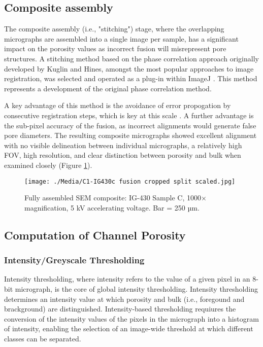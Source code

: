 \documentclass[3p,twocolumn]{elsarticle}
\begin{document}
\subsection{Composite assembly}

The composite assembly (i.e., "stitching") stage, where the overlapping
micrographs are assembled into a single image per sample, has a significant
impact on the porosity values as incorrect fusion will misrepresent pore
structures. A stitching method based on the phase correlation approach
originally developed by Kuglin and Hines, amongst the most popular approaches to
image registration, was selected and operated as a plug-in within ImageJ
\citep{Kuglin1975, Preibisch2009}. This method represents a development of the
original phase correlation method\citep{Preibisch2009}.
	
	 A key advantage of this method is the avoidance of error propogation by
	consecutive registration steps, which is key at this scale
	\citep{Preibisch2009}. A further advantage is the sub-pixel accuracy of the
	fusion, as incorrect alignments would generate false pore diameters. The
	resulting composite micrographs showed excellent alignment with no visible
	delineation between individual micrographs, a relatively high FOV, high
	resolution, and clear distinction between porosity and bulk when examined
	closely (Figure \ref{fig:IG430C split scaled}).

	\begin{figure}
		\centering
		\texttt{[image: ./Media/C1-IG430c fusion cropped split scaled.jpg]}
		\caption{Fully assembled SEM composite: IG-430 Sample C, 1000×  magnification,
     5 kV accelerating voltage. Bar = 250 µm.}
		\label{fig:IG430C split scaled}
	\end{figure} 

	\subsection{Computation of Channel Porosity}
\subsubsection{Intensity/Greyscale Thresholding}
	
	Intensity thresholding, where intensity refers to the value of a given pixel
	in an 8-bit micrograph, is the core of global intensity thresholding.
	Intensity thresholding determines an intensity value at which porosity and
	bulk (i.e., foregound and brackground) are distinguished. Intensity-based
	thresholding requiures the conversion of the intensity values of the pixels in
	the micrograph into a histogram of intensity, enabling the selection of an image-wide
	threshold at which different classes can be separated.
\end{document}
